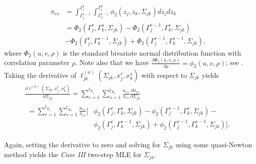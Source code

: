 \begin{equation}
    \begin{split}
        \pi_{rs} &= \int_{{\Gamma}_j^{r-1}}^{{\Gamma}^j_{r}} \int_{{\Gamma}_k^{s-1}}^{{\Gamma}^k_{s}} \phi_2(z_j,z_k,\Sigma_{jk}) dz_j dz_k \\
        &= \Phi_2({\Gamma}_j^r, {\Gamma}_k^s, \Sigma_{jk}) - \Phi_2({\Gamma}_j^{r-1}, {\Gamma}_k^s, \Sigma_{jk}) \\
        &- \Phi_2({\Gamma}_j^r, {\Gamma}_k^{s-1}, \Sigma_{jk}) + \Phi_2({\Gamma}_j^{r-1}, {\Gamma}_k^{s-1}, \Sigma_{jk}),
    \end{split}
\end{equation}
where $\Phi_2(u,v,\rho)$ is the standard bivariate normal distribution function with correlation parameter $\rho$. Note also that we have $\frac{\partial \Phi_2(u,v, \rho)}{\partial \rho} = \phi_2(u,v, \rho)$; see \citep{Tallis62}. Taking the derivative of $\ell_{jk}^{(n)}(\Sigma_{jk}, x_j^r,x_k^s)$ with respect to $\Sigma_{jk}$ yields
\begin{multline*}
        \frac{\partial \ell^{(n)}(\Sigma_{jk}, x_j^r,x_k^s)}{\partial \Sigma_{jk}} = \sum_{r=1}^{l_{X_{j}}}\sum_{s=1}^{l_{X_{k}}} \frac{n_{rs}}{\pi_{rs}} \frac{\partial \pi_{rs}}{\partial \Sigma_{jk}} \\
        \begin{aligned}
        = \sum_{r=1}^{l_{X_{j}}}\sum_{s=1}^{l_{X_{k}}} \frac{n_{rs}}{\pi_{rs}} \Big[&\phi_2({\Gamma}_j^r, {\Gamma}_k^s, \Sigma_{jk}) - \phi_2({\Gamma}_j^{r-1}, {\Gamma}_k^s, \Sigma_{jk}) - \\
        &\phi_2({\Gamma}_j^r, {\Gamma}_k^{s-1}, \Sigma_{jk}) + \phi_2({\Gamma}_j^{r-1}, {\Gamma}_k^{s-1}, \Sigma_{jk})\Big].
        \end{aligned}
\end{multline*}

Again, setting the derivative to zero and solving for $\Sigma_{jk}$ using some quasi-Newton method yields the \textit{Case III} two-step MLE for $\Sigma_{jk}$.



